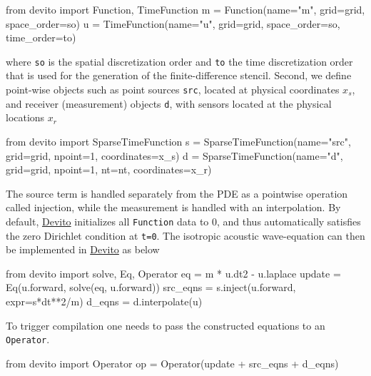 \documentclass[conference]{IEEEtran}
\begin{document}
\begin{python}
from devito import Function, TimeFunction
m = Function(name="m", grid=grid,
             space_order=so)
u = TimeFunction(name="u", grid=grid,
                 space_order=so,
                 time_order=to)
\end{python}

where \texttt{so} is the spatial discretization order and \texttt{to}
the time discretization order that is used for the generation of the
finite-difference stencil. Second, we define point-wise objects such as
point sources \texttt{src}, located at physical coordinates $x_s$, and
receiver (measurement) objects \texttt{d}, with sensors located at the
physical locations $x_r$

\begin{python}
from devito import SparseTimeFunction
s = SparseTimeFunction(name="src",
                       grid=grid, npoint=1,
                       coordinates=x_s)
d = SparseTimeFunction(name="d", grid=grid,
                       npoint=1, nt=nt,
                       coordinates=x_r)
\end{python}

The source term is handled separately from the PDE as a pointwise
operation called injection, while the measurement is handled with an
interpolation. By default, \href{https://github.com/devitocodes/devito}{Devito} initializes all \texttt{Function} data
to 0, and thus automatically satisfies the zero Dirichlet condition at
\texttt{t=0}. The isotropic acoustic wave-equation can then be implemented
in \href{https://github.com/devitocodes/devito}{Devito} as below

\begin{python}
from devito import solve, Eq, Operator
eq = m * u.dt2 - u.laplace
update = Eq(u.forward, solve(eq, u.forward))
src_eqns = s.inject(u.forward, expr=s*dt**2/m)
d_eqns = d.interpolate(u)
\end{python}

To trigger compilation one needs to pass the constructed equations to an
\texttt{Operator}.

\begin{python}
from devito import Operator
op = Operator(update + src_eqns + d_eqns)
\end{python}
\end{document}
